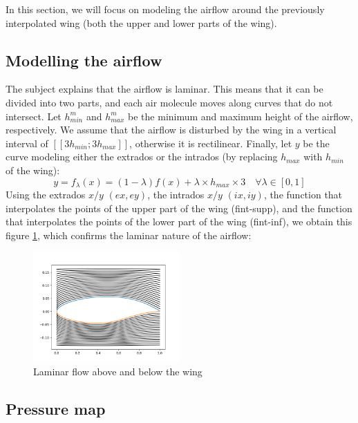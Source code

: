 In this section, we will focus on modeling the airflow around the previously interpolated wing (both the upper and lower parts of the wing).
\subsection{Modelling the airflow}
The subject explains that the airflow is laminar. This means that it can be divided into two parts, and each air molecule moves along curves that do not intersect. Let $h_{min}^{m}$ and $h_{max}^{m}$ be the minimum and maximum height of the airflow, respectively. We assume that the airflow is disturbed by the wing in a vertical interval of $[[3h_{min}; 3h_{max}]]$, otherwise it is rectilinear. Finally, let $y$ be the curve modeling either the extrados or the intrados (by replacing $h_{max}$ with $h_{min}$ of the wing):
\begin{equation}
    \label{eq:equation_part3.1}
    y = f_{\lambda}(x) = (1 - \lambda)f(x) + \lambda \times h_{max} \times 3 \quad \forall \lambda \in [0,1] 
\end{equation}
Using the extrados $x/y$ $(ex, ey)$, the intrados $x/y$ $(ix, iy)$, the function that interpolates the points of the upper part of the wing (fint-supp), and the function that interpolates the points of the lower part of the wing (fint-inf), we obtain this figure \ref{fig:laminar}, which confirms the laminar nature of the airflow:
\begin{figure}[H]
  \centering
  \includegraphics[width=0.5\textwidth]{laminar_flow.png}
  \caption{Laminar flow above and below the wing}
  \label{fig:laminar}
\end{figure}
\subsection{Pressure map}
